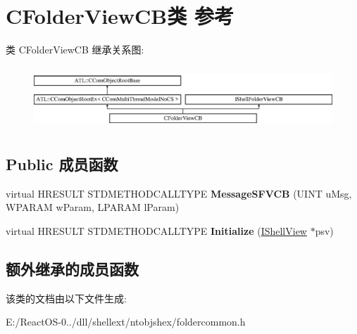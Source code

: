 \hypertarget{class_c_folder_view_c_b}{}\section{C\+Folder\+View\+C\+B类 参考}
\label{class_c_folder_view_c_b}
类 C\+Folder\+View\+CB 继承关系图\+:\begin{figure}[H]
\begin{center}
\leavevmode
\includegraphics[height=2.386364cm]{class_c_folder_view_c_b}
\end{center}
\end{figure}
\subsection*{Public 成员函数}
\begin{DoxyCompactItemize}
\item 
\mbox{\label{class_c_folder_view_c_b_abb6407be4d924df3f4326c9f65547dbd}} 
virtual H\+R\+E\+S\+U\+LT S\+T\+D\+M\+E\+T\+H\+O\+D\+C\+A\+L\+L\+T\+Y\+PE {\bfseries Message\+S\+F\+V\+CB} (U\+I\+NT u\+Msg, W\+P\+A\+R\+AM w\+Param, L\+P\+A\+R\+AM l\+Param)
\item 
\mbox{\label{class_c_folder_view_c_b_a3622206b67e0cf581079b38daa8c6c6c}} 
virtual H\+R\+E\+S\+U\+LT S\+T\+D\+M\+E\+T\+H\+O\+D\+C\+A\+L\+L\+T\+Y\+PE {\bfseries Initialize} (\hyperlink{interface_i_shell_view}{I\+Shell\+View} $\ast$psv)
\end{DoxyCompactItemize}
\subsection*{额外继承的成员函数}


该类的文档由以下文件生成\+:\begin{DoxyCompactItemize}
\item 
E\+:/\+React\+O\+S-\/0../dll/shellext/ntobjshex/foldercommon.\+h\end{DoxyCompactItemize}
